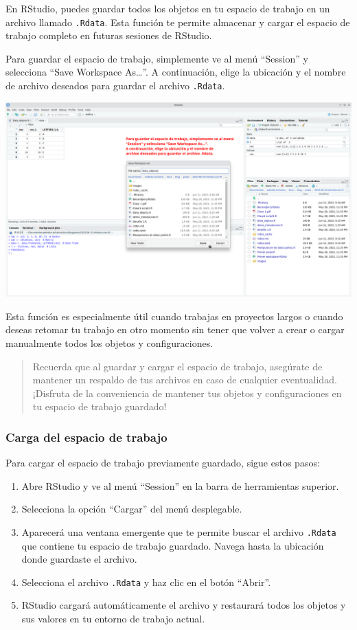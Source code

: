 \documentclass[
  a4paper,
]{article}
\providecommand{\tightlist}{%
  \setlength{\itemsep}{0pt}\setlength{\parskip}{0pt}}\usepackage{longtable,booktabs,array}
\begin{document}
En RStudio, puedes guardar todos los objetos en tu espacio de trabajo en
un archivo llamado \texttt{.Rdata}. Esta función te permite almacenar y
cargar el espacio de trabajo completo en futuras sesiones de RStudio.

Para guardar el espacio de trabajo, simplemente ve al menú ``Session'' y
selecciona ``Save Workspace As\ldots{}''. A continuación, elige la
ubicación y el nombre de archivo deseados para guardar el archivo
\texttt{.Rdata}.

\includegraphics{images/Screenshot_20230611_095350.png}

Esta función es especialmente útil cuando trabajas en proyectos largos o
cuando deseas retomar tu trabajo en otro momento sin tener que volver a
crear o cargar manualmente todos los objetos y configuraciones.

\begin{quote}
Recuerda que al guardar y cargar el espacio de trabajo, asegúrate de
mantener un respaldo de tus archivos en caso de cualquier eventualidad.
¡Disfruta de la conveniencia de mantener tus objetos y configuraciones
en tu espacio de trabajo guardado!
\end{quote}

\hypertarget{carga-del-espacio-de-trabajo}{%
\subsubsection{Carga del espacio de
trabajo}\label{carga-del-espacio-de-trabajo}}

Para cargar el espacio de trabajo previamente guardado, sigue estos
pasos:

\begin{enumerate}
\def\labelenumi{\arabic{enumi}.}
\tightlist
\item
  Abre RStudio y ve al menú ``Session'' en la barra de herramientas
  superior.
\item
  Selecciona la opción ``Cargar'' del menú desplegable.
\item
  Aparecerá una ventana emergente que te permite buscar el archivo
  \texttt{.Rdata} que contiene tu espacio de trabajo guardado. Navega
  hasta la ubicación donde guardaste el archivo.
\item
  Selecciona el archivo \texttt{.Rdata} y haz clic en el botón
  ``Abrir''.
\item
  RStudio cargará automáticamente el archivo y restaurará todos los
  objetos y sus valores en tu entorno de trabajo actual.
\end{enumerate}
\end{document}
